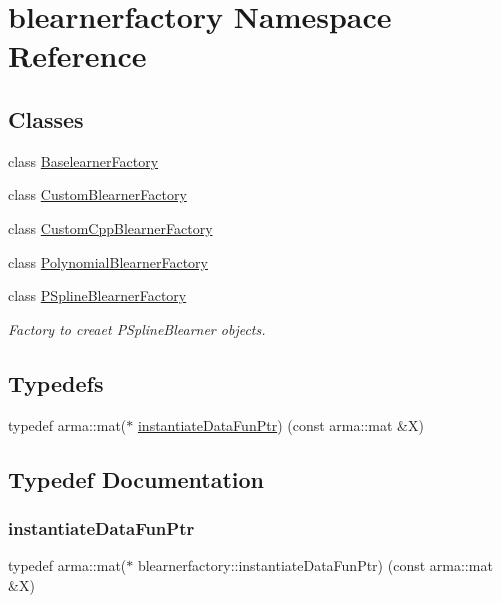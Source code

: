 \hypertarget{namespaceblearnerfactory}{}\section{blearnerfactory Namespace Reference}
\label{namespaceblearnerfactory}
\subsection*{Classes}
\begin{DoxyCompactItemize}
\item 
class \mbox{\hyperlink{classblearnerfactory_1_1_baselearner_factory}{Baselearner\+Factory}}
\item 
class \mbox{\hyperlink{classblearnerfactory_1_1_custom_blearner_factory}{Custom\+Blearner\+Factory}}
\item 
class \mbox{\hyperlink{classblearnerfactory_1_1_custom_cpp_blearner_factory}{Custom\+Cpp\+Blearner\+Factory}}
\item 
class \mbox{\hyperlink{classblearnerfactory_1_1_polynomial_blearner_factory}{Polynomial\+Blearner\+Factory}}
\item 
class \mbox{\hyperlink{classblearnerfactory_1_1_p_spline_blearner_factory}{P\+Spline\+Blearner\+Factory}}
\begin{DoxyCompactList}\small\item\em Factory to creaet {\ttfamily P\+Spline\+Blearner} objects. \end{DoxyCompactList}\end{DoxyCompactItemize}
\subsection*{Typedefs}
\begin{DoxyCompactItemize}
\item 
typedef arma\+::mat($\ast$ \mbox{\hyperlink{namespaceblearnerfactory_a74e80c9723f4fa8866e09a04dfa3035b}{instantiate\+Data\+Fun\+Ptr}}) (const arma\+::mat \&X)
\end{DoxyCompactItemize}


\subsection{Typedef Documentation}
\mbox{\label{namespaceblearnerfactory_a74e80c9723f4fa8866e09a04dfa3035b}} 
\subsubsection{\texorpdfstring{instantiate\+Data\+Fun\+Ptr}{instantiateDataFunPtr}}
{\footnotesize\ttfamily typedef arma\+::mat($\ast$ blearnerfactory\+::instantiate\+Data\+Fun\+Ptr) (const arma\+::mat \&X)}

